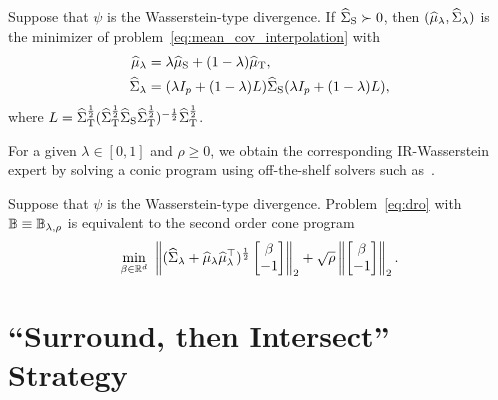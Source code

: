 \documentclass{article}
\begin{document}
\begin{proposition}
\label{prop:wass_interpolation}
Suppose that $\psi$ is the Wasserstein-type divergence. If $\widehat{\Sigma}_{\rm S} \succ 0$, then $(\widehat {\mu}_\lambda, \widehat{\Sigma}_\lambda)$ is the minimizer of problem~\eqref{eq:mean_cov_interpolation} with
\begin{align*}
    \widehat {\mu}_\lambda &= \lambda \widehat {\mu}_{\rm S} + (1-\lambda) \widehat {\mu}_{\rm T}, \\
    \widehat {\Sigma}_\lambda &= (\lambda I_p + (1-\lambda) L) \widehat{\Sigma}_{\rm S} (\lambda I_p + (1-\lambda) L) ,
\end{align*}
where $L = \widehat{\Sigma}_{\rm T}^{\frac{1}{2}} (\widehat{\Sigma}_{\rm T}^{\frac{1}{2}} \widehat{\Sigma}_{\rm S} \widehat{\Sigma}_{\rm T}^{\frac{1}{2}})^{-\frac{1}{2}} \widehat{\Sigma}_{\rm T}^{\frac{1}{2}}$.
\end{proposition}
For a given $\lambda \in [0, 1]$ and $\rho \ge 0$, we obtain the corresponding IR-Wasserstein expert by solving a conic program using off-the-shelf solvers such as~\citet{mosek}.
\begin{proposition} \label{prop:IR_W}
Suppose that $\psi$ is the Wasserstein-type divergence. Problem~\eqref{eq:dro} with $\mathbb B \equiv \mathbb B_{\lambda, \rho}$ is equivalent to the second order cone program
\[
    \min\limits_{\beta \in \mathbb{R}^d} ~ \left\|(\widehat{\Sigma}_\lambda + \widehat {\mu}_\lambda \widehat {\mu}_\lambda^\top)^{\frac{1}{2}} \begin{bmatrix}
        \beta \\
        -1
    \end{bmatrix} \right\|_2 + \sqrt{\rho} \left\| \begin{bmatrix}
        \beta \\
        -1
    \end{bmatrix} \right\|_2.
\]
\end{proposition}


\section{``Surround, then Intersect'' Strategy}
\label{sec:SI}
\end{document}
